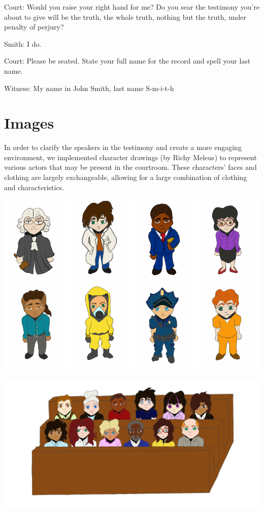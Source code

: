 \documentclass[print]{nuthesis}
\begin{document}
Court: Would you raise your right hand for me? Do you sear the testimony you're about to give will be the truth, the whole truth, nothing but the truth, under penalty of perjury?

Smith: I do.

Court: Please be seated. State your full name for the record and spell your last name.

Witness: My name in John Smith, last name S-m-i-t-h

\hypertarget{images}{%
\section{Images}\label{images}}

In order to clarify the speakers in the testimony and create a more engaging environment, we implemented character drawings (by Richy Meleus) to represent various actors that may be present in the courtroom. These characters' faces and clothing are largely exchangeable, allowing for a large combination of clothing and characteristics.

\includegraphics[width=\linewidth]{thesis_files/figure-latex/demo_evidence-1}

\includegraphics[width=\linewidth]{images/Jury}
\end{document}
